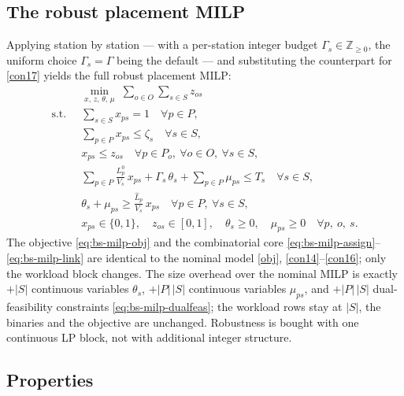 \subsection{The robust placement MILP}
\label{sec:robust-milp}

Applying  station by station --- with a per-station
integer budget $\Gamma_s \in \mathbb Z_{\ge 0}$, the uniform choice
$\Gamma_s = \Gamma$ being the default --- and substituting the counterpart
for \eqref{con17} yields the full
robust placement MILP:
\begin{subequations}
\label{eq:bs-milp}
\begin{align}
&\min_{x,\,z,\,\theta,\,\mu} \; \sum_{o \in O} \sum_{s \in S} z_{os}
  \label{eq:bs-milp-obj}\\
\text{s.t.}\;\;
&\sum_{s \in S} x_{ps} = 1
  \quad \forall p \in P, \label{eq:bs-milp-assign}\\
&\sum_{p \in P} x_{ps} \le \zeta_s
  \quad \forall s \in S, \label{eq:bs-milp-slot}\\
&x_{ps} \le z_{os}
  \quad \forall p \in P_o,\ \forall o \in O,\ \forall s \in S, \label{eq:bs-milp-link}\\
&\sum_{p \in P} \frac{L^0_p}{V_s}\, x_{ps}
  + \Gamma_s\, \theta_s
  + \sum_{p \in P} \mu_{ps} \le T_s
  \quad \forall s \in S, \label{eq:bs-milp-wl}\\
&\theta_s + \mu_{ps} \ge \frac{\hat L_p}{V_s}\, x_{ps}
  \quad \forall p \in P,\ \forall s \in S, \label{eq:bs-milp-dualfeas}\\
&x_{ps} \in \{0,1\},\quad z_{os} \in [0,1],\quad
  \theta_s \ge 0,\quad \mu_{ps} \ge 0
  \quad \forall p,\ o,\ s. \label{eq:bs-milp-dom}
\end{align}
\end{subequations}
The objective \eqref{eq:bs-milp-obj} and the combinatorial core
\eqref{eq:bs-milp-assign}--\eqref{eq:bs-milp-link} are identical to the
nominal model \eqref{obj}, \eqref{con14}--\eqref{con16}; only the workload
block changes. The size overhead over the nominal MILP is exactly $+|S|$
continuous variables $\theta_s$, $+|P|\,|S|$ continuous variables $\mu_{ps}$,
and $+|P|\,|S|$ dual-feasibility constraints \eqref{eq:bs-milp-dualfeas};
the workload rows stay at $|S|$, the binaries and the objective are
unchanged. Robustness is bought with one continuous LP block, not with
additional integer structure.

\subsection{Properties}
\label{sec:properties}

